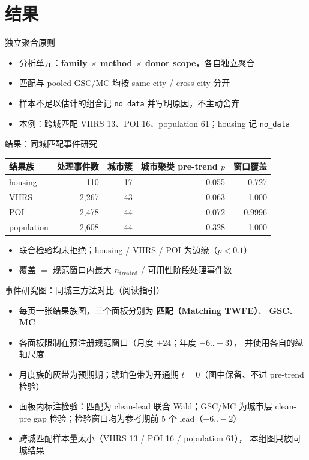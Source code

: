 \documentclass[aspectratio=169,11pt]{beamer}
\newcommand{\key}[1]{\textbf{\color{blue!55!black}#1}}
\begin{document}
\section{结果}

\begin{frame}{独立聚合原则}
  \begin{itemize}
    \item 分析单元：\key{family $\times$ method $\times$ donor scope}，各自独立聚合
    \item 匹配与 pooled GSC/MC 均按 same-city / cross-city 分开
    \item 样本不足以估计的组合记 \texttt{no\_data} 并写明原因，不主动舍弃
    \item 本例：跨城匹配 VIIRS 13、POI 16、population 61；housing 记 \texttt{no\_data}
  \end{itemize}
\end{frame}

\begin{frame}{结果：同城匹配事件研究}
  \small
  \begin{tabular}{lrrrr}
    \toprule
    结果族 & 处理事件数 & 城市簇 & 城市聚类 pre-trend $p$ & 窗口覆盖 \\
    \midrule
    housing & 110 & 17 & 0.055 & 0.727 \\
    VIIRS & 2{,}267 & 43 & 0.063 & 1.000 \\
    POI & 2{,}478 & 44 & 0.072 & 0.9996 \\
    population & 2{,}608 & 44 & 0.328 & 1.000 \\
    \bottomrule
  \end{tabular}
  \medskip
  \begin{itemize}
    \item 联合检验均未拒绝；housing / VIIRS / POI 为边缘（$p<0.1$）
    \item 覆盖 $=$ 规范窗口内最大 $n_{\text{treated}}$ / 可用性阶段处理事件数
  \end{itemize}
\end{frame}

\begin{frame}{事件研究图：同城三方法对比（阅读指引）}
  \small
  \begin{itemize}
    \item 每页一张结果族图，三个面板分别为 \key{匹配（Matching TWFE）}、
      \key{GSC}、\key{MC}
    \item 各面板限制在预注册规范窗口（月度 $\pm24$；年度 $-6..+3$），
      并使用各自的纵轴尺度
    \item 月度族的灰带为预期期；琥珀色带为开通期 $t=0$（图中保留、不进 pre-trend 检验）
    \item 面板内标注检验：匹配为 clean-lead 联合 Wald；GSC/MC 为城市层
      clean-pre gap 检验；检验窗口均为参考期前 5 个 lead（$-6..-2$）
    \item 跨城匹配样本量太小（VIIRS 13 / POI 16 / population 61），
      本组图只放同城结果
  \end{itemize}
\end{frame}
\end{document}
